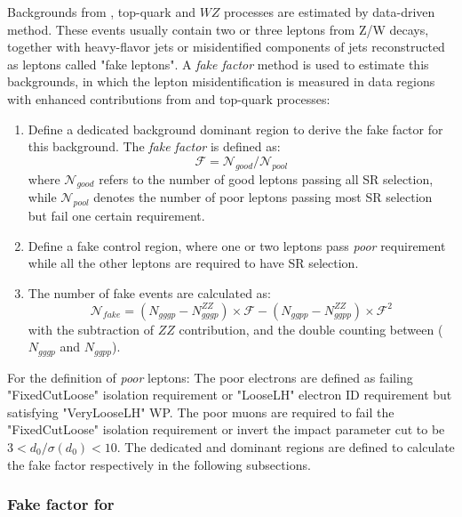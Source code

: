 Backgrounds from \Zjet, top-quark and $WZ$ processes are estimated by data-driven method.
These events usually contain two or three leptons from Z/W decays, together with heavy-flavor jets or misidentified components of jets reconstructed as leptons called "fake leptons".
A \textit{fake factor} method is used to estimate this backgrounds, in which the lepton misidentification is measured in data regions 
with enhanced contributions from \Zjet and top-quark processes:
\begin{enumerate}
	\item Define a dedicated background dominant region to derive the fake factor for this background. 
The \textit{fake factor} is defined as:
\begin{equation}
	\mathcal{F} = \mathcal{N}_{good} / \mathcal{N}_{pool}
\end{equation}
where $\mathcal{N}_{good}$ refers to the number of good leptons passing all SR selection, while $\mathcal{N}_{pool}$ denotes the number of poor leptons passing most SR selection but fail one certain requirement.
	\item Define a \lllljj fake control region, where one or two leptons pass \textit{poor} requirement while all the other leptons are required to have SR selection.
	\item The number of fake events are calculated as:
\begin{equation}
	\mathcal{N}_{fake} = \left( N_{gggp} - N_{gggp}^{ZZ} \right) \times \mathcal{F} - \left( N_{ggpp} - N_{ggpp}^{ZZ} \right) \times \mathcal{F}^{2}
\end{equation}
with the subtraction of $ZZ$ contribution, and the double counting between ($N_{gggp}$ and $N_{ggpp}$).
\end{enumerate}

For the definition of \textit{poor} leptons:
The poor electrons are defined as failing "FixedCutLoose" isolation requirement or "LooseLH" electron ID requirement but satisfying "VeryLooseLH" WP.
The poor muons are required to fail the "FixedCutLoose" isolation requirement or invert the impact parameter cut to be $3 < d_{0}/\sigma(d_{0}) < 10$.
The dedicated \Zjet and \ttbar dominant regions are defined to calculate the fake factor respectively in the following subsections.

\subsubsection{Fake factor for \Zjet}

